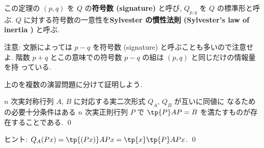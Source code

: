 \documentclass[12pt,twoside]{jarticle}
\begin{document}
この定理の $(p,q)$ を $Q$ の{\bf 符号数 (signature)} と呼び, 
$Q_{p,q}$ を $Q$ の標準形と呼ぶ.
$Q$ に対する符号数の一意性を{\bf Sylvester の慣性法則 (Sylvester's law of
inertia )} と呼ぶ.

\medskip
\noindent
注意: 文脈によっては $p-q$ を符号数 (signature) と呼ぶことも多いので注意せよ.
階数 $p+q$ とこの意味での符号数 $p-q$ の組は $(p,q)$ と同じだけの情報量を持
っている.

\medskip

上のを複数の演習問題に分けて証明しよう.


\begin{question}
\label{q:sylvester-1}
  $n$ 次実対称行列 $A$, $B$ に対応する実二次形式 $Q_A$, $Q_B$ が互いに同値に
  なるための必要十分条件はある $n$ 次実正則行列 $P$ で $\tp{P}AP=B$ 
  を満たすものが存在することである.  \qed
\end{question}

\noindent
ヒント: $Q_A(Px)=\tp{(Px)}APx=\tp{x}\tp{P}APx$.
\qed

\end{document}
